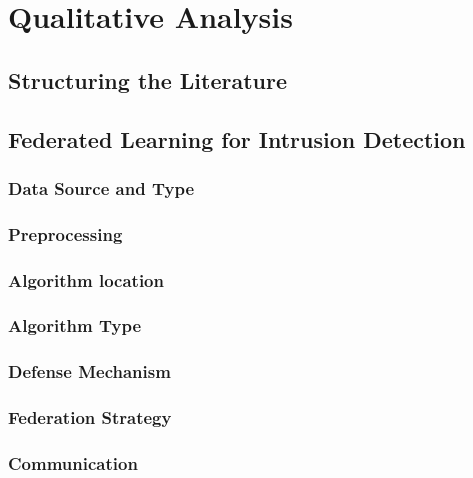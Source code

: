 \section{Qualitative Analysis\label{sec:sota.quali}}

\subsection{Structuring the Literature\label{sec:sota.quali.structure}}

\subsection{Federated Learning for Intrusion Detection\label{sec:sota.quali.fl}}

\subsubsection{Data Source and Type\label{sec:sota.quali.fl.data}}

\subsubsection{Preprocessing\label{sec:sota.quali.fl.model}}

\subsubsection{Algorithm location\label{sec:sota.quali.fl.location}}

\subsubsection{Algorithm Type\label{sec:sota.quali.fl.type}}

\subsubsection{Defense Mechanism\label{sec:sota.quali.fl.defense}}

\subsubsection{Federation Strategy\label{sec:sota.quali.fl.fed}}

\subsubsection{Communication\label{sec:sota.quali.fl.comm}}

